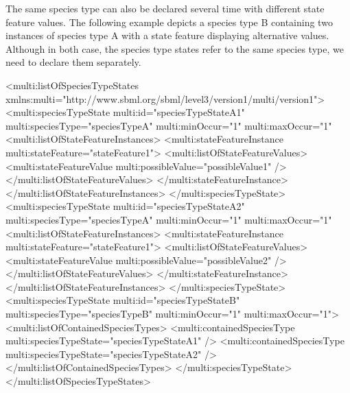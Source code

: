 The same species type can also be declared several time with different state feature values. The following example depicts a species type B containing two instances of species type A with a state feature displaying alternative values. Although in both case, the species type states refer to the same species type, we need to declare them separately.

\begin{example}
<multi:listOfSpeciesTypeStates
                   xmlns:multi="http://www.sbml.org/sbml/level3/version1/multi/version1">
  <multi:speciesTypeState multi:id="speciesTypeStateA1" multi:speciesType="speciesTypeA" 
                          multi:minOccur="1" multi:maxOccur="1" 
    <multi:listOfStateFeatureInstances>
      <multi:stateFeatureInstance multi:stateFeature="stateFeature1">
        <multi:listOfStateFeatureValues>
          <multi:stateFeatureValue multi:possibleValue="possibleValue1" />
        </multi:listOfStateFeatureValues>
      </multi:stateFeatureInstance>
    </multi:listOfStateFeatureInstances>
  </multi:speciesTypeState>
  <multi:speciesTypeState multi:id="speciesTypeStateA2" multi:speciesType="speciesTypeA" 
                          multi:minOccur="1" multi:maxOccur="1" 
    <multi:listOfStateFeatureInstances>
      <multi:stateFeatureInstance multi:stateFeature="stateFeature1">
        <multi:listOfStateFeatureValues>
          <multi:stateFeatureValue multi:possibleValue="possibleValue2" />
        </multi:listOfStateFeatureValues>
      </multi:stateFeatureInstance>
    </multi:listOfStateFeatureInstances>
  </multi:speciesTypeState>
  <multi:speciesTypeState multi:id="speciesTypeStateB" multi:speciesType="speciesTypeB"
                          multi:minOccur="1" multi:maxOccur="1">
    <multi:listOfContainedSpeciesTypes>
      <multi:containedSpeciesType multi:speciesTypeState="speciesTypeStateA1" />
      <multi:containedSpeciesType multi:speciesTypeState="speciesTypeStateA2" />
    </multi:listOfContainedSpeciesTypes>
  </multi:speciesTypeState>
</multi:listOfSpeciesTypeStates>
\end{example}

